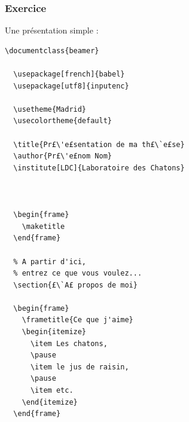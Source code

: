 \begin{frame}[fragile]
  \frametitle{Exercice}

Une présentation simple :

\begin{lstlisting}[multicols=2]
  \documentclass{beamer}

  \usepackage[french]{babel}
  \usepackage[utf8]{inputenc}

  \usetheme{Madrid}
  \usecolortheme{default}

  \title{Pr£\'e£sentation de ma th£\`e£se}
  \author{Pr£\'e£nom Nom}
  \institute[LDC]{Laboratoire des Chatons}

  

  \begin{frame}
    \maketitle
  \end{frame}

  % A partir d'ici,
  % entrez ce que vous voulez...
  \section{£\`A£ propos de moi}

  \begin{frame}
    \frametitle{Ce que j'aime}
    \begin{itemize}
      \item Les chatons,
      \pause
      \item le jus de raisin,
      \pause
      \item etc.
    \end{itemize}
  \end{frame}

  
\end{lstlisting}

\end{frame}


